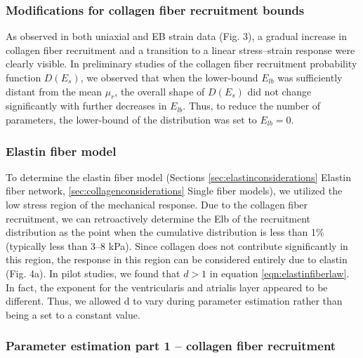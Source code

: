    
\subsubsection{Modifications for collagen fiber recruitment bounds}

    As observed in both uniaxial and EB strain data (Fig. 3), a gradual increase in collagen fiber recruitment and a transition to a linear stress–strain response were clearly visible. In preliminary studies of the collagen fiber recruitment probability function $D(E_s)$, we observed that when the lower-bound $E_{lb}$ was sufficiently distant from the mean $\mu_r$, the overall shape of $D(E_s)$ did not change significantly with further decreases in $E_{lb}$. Thus, to reduce the number of parameters, the lower-bound of the distribution was set to $E_{lb} = 0$.
    

\subsubsection{Elastin fiber model}

    To determine the elastin fiber model (Sections \ref{sec:elastinconsiderations} Elastin fiber network, \ref{sec:collagenconsiderations} Single fiber models), we utilized the low stress region of the mechanical response. Due to the collagen fiber recruitment, we can retroactively determine the Elb of the recruitment distribution as the point when the cumulative distribution is less than 1\% (typically less than 3–8 kPa). Since collagen does not contribute significantly in this region, the response in this region can be considered entirely due to elastin (Fig. 4a). In pilot studies, we found that $d>1$ in equation \ref{eqn:elastinfiberlaw}. In fact, the exponent for the ventricularis and atrialis layer appeared to be different. Thus, we allowed d to vary during parameter estimation rather than being a set to a constant value.


\subsubsection{Parameter estimation part 1 – collagen fiber recruitment}

